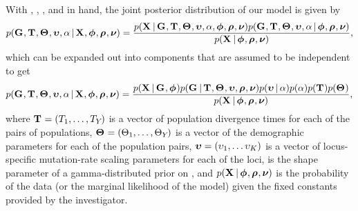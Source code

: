 \begin{linenomath}
With \alignmentVector, \hkyModelVector, \ploidyScalarVector, and
\mutationRateScalarConstantVector in hand, the joint posterior distribution
of our model is given by
\begin{equation}
    p(\geneTreeVector, \divTimeMapVector, \demographicParamVector, 
    \locusMutationRateScalarVector, \locusRateHetShapeParameter \given
    \alignmentVector, \hkyModelVector, \ploidyScalarVector,
    \mutationRateScalarConstantVector) =
    \frac{p(\alignmentVector \given \geneTreeVector, \divTimeMapVector,
        \demographicParamVector, \locusMutationRateScalarVector,
        \locusRateHetShapeParameter, \hkyModelVector, \ploidyScalarVector,
        \mutationRateScalarConstantVector)
        p(\geneTreeVector, \divTimeMapVector, \demographicParamVector,
        \locusMutationRateScalarVector, \locusRateHetShapeParameter \given
        \hkyModelVector, \ploidyScalarVector,
        \mutationRateScalarConstantVector)}{
        p(\alignmentVector \given \hkyModelVector, \ploidyScalarVector,
        \mutationRateScalarConstantVector)},
    \label{eq:fullModelCompactJoint}
\end{equation}
which can be expanded out into components that are assumed to be independent
to get
\begin{equation}
    p(\geneTreeVector, \divTimeMapVector, \demographicParamVector, 
    \locusMutationRateScalarVector, \locusRateHetShapeParameter \given
    \alignmentVector, \hkyModelVector, \ploidyScalarVector,
    \mutationRateScalarConstantVector) =
    \frac{p(\alignmentVector \given \geneTreeVector, \hkyModelVector)
        p(\geneTreeVector \given \divTimeMapVector, \demographicParamVector,
        \locusMutationRateScalarVector, \ploidyScalarVector,
        \mutationRateScalarConstantVector)
        p(\locusMutationRateScalarVector \given \locusRateHetShapeParameter)
        p(\locusRateHetShapeParameter)
        p(\divTimeMapVector)
        p(\demographicParamVector)}{
        p(\alignmentVector \given \hkyModelVector, \ploidyScalarVector,
        \mutationRateScalarConstantVector)},
    \label{eq:fullModelCompact}
\end{equation}
where
$\mathbf{T_{}} = (T_{1}, \ldots, T_{Y_{}})$
is a vector of population divergence times for each of the \npairs{} pairs of
populations,
$\mathbf{\Theta_{}} = (\Theta_{1}, \ldots,
\Theta_{Y_{}})$
is a vector of the demographic parameters for each of the \npairs{} population
pairs,
$\boldsymbol{\upsilon} = (\upsilon_{1}, \ldots
\upsilon_{K})$
is a vector of locus-specific mutation-rate scaling parameters for each of the
\nlociTotal loci,
\locusRateHetShapeParameter is the shape parameter of a gamma-distributed
prior on \locusMutationRateScalar{}, and
$p(\alignmentVector \given \hkyModelVector, \ploidyScalarVector,
\mutationRateScalarConstantVector)$
is the probability of the data (or the marginal likelihood of the model) given
the fixed constants provided by the investigator.
\end{linenomath}

